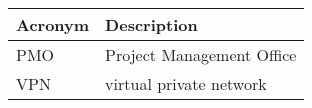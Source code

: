 \addtocounter{table}{-1}
\begin{longtable}{p{}p{}}\hline
\textbf{Acronym} & \textbf{Description}  \\\hline

PMO & Project Management Office \\\hline
VPN & virtual private network \\\hline
\end{longtable}
